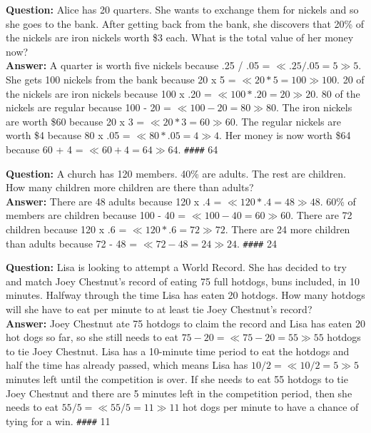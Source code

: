 \begin{tcolorbox}[colback=blue!5!white,colframe=blue!75!black,title=Example 1]
\textbf{Question:} Alice has 20 quarters. She wants to exchange them for nickels and so she goes to the bank. After getting back from the bank, she discovers that 20\% of the nickels are iron nickels worth \$3 each. What is the total value of her money now? \\
\textbf{Answer:} A quarter is worth five nickels because .25 / .05 = \(\ll.25/.05=5\gg 5\). She gets 100 nickels from the bank because 20 x 5 = \(\ll20*5=100\gg 100\). 20 of the nickels are iron nickels because 100 x .20 = \(\ll100*.20=20\gg 20\). 80 of the nickels are regular because 100 - 20 = \(\ll100-20=80\gg 80\). The iron nickels are worth \$60 because 20 x 3 = \(\ll20*3=60\gg 60\). The regular nickels are worth \$4 because 80 x .05 = \(\ll80*.05=4\gg 4\). Her money is now worth \$64 because 60 + 4 = \(\ll60+4=64\gg 64\). \texttt{\#\#\#\#} 64
\end{tcolorbox}

\begin{tcolorbox}[colback=blue!5!white,colframe=blue!75!black,title=Example 2]
\textbf{Question:} A church has 120 members. 40\% are adults. The rest are children. How many children more children are there than adults? \\
\textbf{Answer:} There are 48 adults because 120 x .4 = \(\ll120*.4=48\gg 48\). 60\% of members are children because 100 - 40 = \(\ll100-40=60\gg 60\). There are 72 children because 120 x .6 = \(\ll120*.6=72\gg 72\). There are 24 more children than adults because 72 - 48 = \(\ll72-48=24\gg 24\). \texttt{\#\#\#\#} 24
\end{tcolorbox}

\begin{tcolorbox}[colback=blue!5!white,colframe=blue!75!black,title=Example 3]
\textbf{Question:} Lisa is looking to attempt a World Record. She has decided to try and match Joey Chestnut's record of eating 75 full hotdogs, buns included, in 10 minutes. Halfway through the time Lisa has eaten 20 hotdogs. How many hotdogs will she have to eat per minute to at least tie Joey Chestnut's record? \\
\textbf{Answer:} Joey Chestnut ate 75 hotdogs to claim the record and Lisa has eaten 20 hot dogs so far, so she still needs to eat \(75-20=\ll75-20=55\gg 55\) hotdogs to tie Joey Chestnut. Lisa has a 10-minute time period to eat the hotdogs and half the time has already passed, which means Lisa has \(10/2=\ll10/2=5\gg 5\) minutes left until the competition is over. If she needs to eat 55 hotdogs to tie Joey Chestnut and there are 5 minutes left in the competition period, then she needs to eat \(55/5=\ll55/5=11\gg 11\) hot dogs per minute to have a chance of tying for a win. \texttt{\#\#\#\#} 11
\end{tcolorbox}
